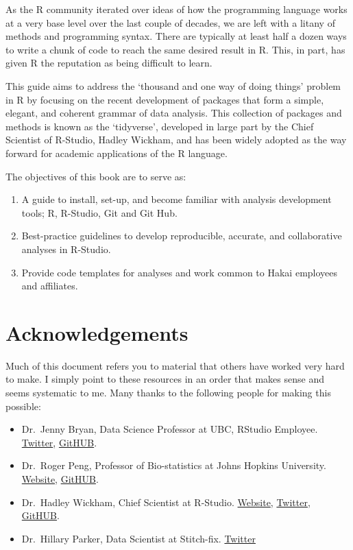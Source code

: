 \documentclass[]{book}
\providecommand{\tightlist}{%
  \setlength{\itemsep}{0pt}\setlength{\parskip}{0pt}}
\begin{document}
As the R community iterated over ideas of how the programming language
works at a very base level over the last couple of decades, we are left
with a litany of methods and programming syntax. There are typically at
least half a dozen ways to write a chunk of code to reach the same
desired result in R. This, in part, has given R the reputation as being
difficult to learn.

This guide aims to address the `thousand and one way of doing things'
problem in R by focusing on the recent development of packages that form
a simple, elegant, and coherent grammar of data analysis. This
collection of packages and methods is known as the `tidyverse',
developed in large part by the Chief Scientist of R-Studio, Hadley
Wickham, and has been widely adopted as the way forward for academic
applications of the R language.

The objectives of this book are to serve as:

\begin{enumerate}
\def\labelenumi{\arabic{enumi})}
\item
  A guide to install, set-up, and become familiar with analysis
  development tools; R, R-Studio, Git and Git Hub.
\item
  Best-practice guidelines to develop reproducible, accurate, and
  collaborative analyses in R-Studio.
\item
  Provide code templates for analyses and work common to Hakai employees
  and affiliates.
\end{enumerate}

\section{Acknowledgements}\label{acknowledgements}

Much of this document refers you to material that others have worked
very hard to make. I simply point to these resources in an order that
makes sense and seems systematic to me. Many thanks to the following
people for making this possible:

\begin{itemize}
\tightlist
\item
  Dr.~Jenny Bryan, Data Science Professor at UBC, RStudio Employee.
  \href{https://twitter.com/JennyBryan}{Twitter},
  \href{https://github.com/jennybc}{GitHUB}.
\item
  Dr.~Roger Peng, Professor of Bio-statistics at Johns Hopkins
  University. \href{http://www.biostat.jhsph.edu/~rpeng/}{Website},
  \href{https://github.com/rdpeng}{GitHUB}.
\item
  Dr.~Hadley Wickham, Chief Scientist at R-Studio.
  \href{http://hadley.nz/}{Website},
  \href{https://twitter.com/hadleywickham}{Twitter},
  \href{https://github.com/hadley}{GitHUB}.
\item
  Dr.~Hillary Parker, Data Scientist at Stitch-fix.
  \href{https://twitter.com/hspter}{Twitter}
\end{itemize}
\end{document}
